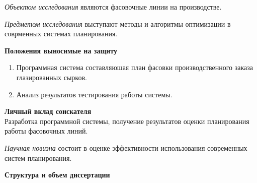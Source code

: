\textit{Объектом исследования} являются фасовочные линии на производстве.

\vspace{6mm}

\textit{Предметом исследования} выступают методы и алгоритмы оптимизации в соврменных системах планирования.

\vspace{6mm}

\noindent \textbf{Положения выносимые на защиту}
\begin{enumerate}
    \item Программная система составляюшая план фасовки производственного заказа глазированных сырков.
    \item Анализ результатов тестирования работы системы.
\end{enumerate}

\vspace{6mm}

\noindent \textbf{Личный вклад соискателя}\\
\indent Разработка программной системы, получение результатов оценки планирования работы фасовочных линий.

\vspace{6mm}

\textit{Научная новизна} состоит в оценке эффективности использования современных систем планирования.

\vspace{6mm}

\noindent \textbf{Структура и объем диссертации}\\
